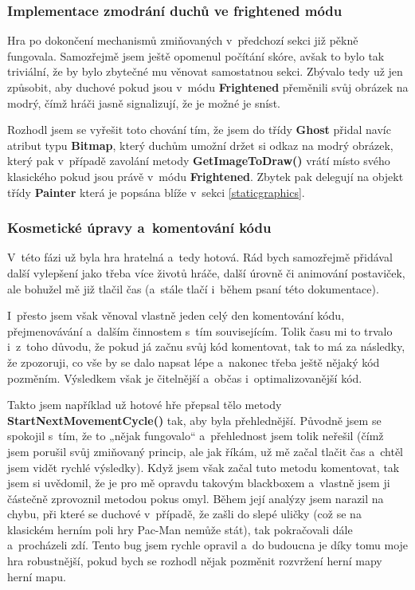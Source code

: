 \documentclass[a4]{article}
\begin{document}
\subsubsection{Implementace zmodrání duchů ve frightened módu} \label{frightenedmode}
Hra po dokončení mechanismů zmiňovaných v~předchozí sekci již pěkně fungovala. Samozřejmě jsem ještě opomenul počítání skóre, avšak to bylo tak triviální, že by bylo zbytečné mu věnovat samostatnou sekci. Zbývalo tedy už jen způsobit, aby duchové pokud jsou v~módu \textbf{Frightened} přeměnili svůj obrázek na modrý, čímž hráči jasně signalizují, že je možné je sníst. 

Rozhodl jsem se vyřešit toto chování tím, že jsem do třídy \textbf{Ghost} přidal navíc atribut typu \textbf{Bitmap}, který duchům umožní držet si odkaz na modrý obrázek, který pak v~případě zavolání metody \textbf{GetImageToDraw()} vrátí místo svého klasického pokud jsou právě v~módu \textbf{Frightened}. Zbytek pak delegují na objekt třídy \textbf{Painter} která je popsána blíže v~sekci \ref{staticgraphics}.

\subsubsection{Kosmetické úpravy a~komentování kódu}
V~této fázi už byla hra hratelná a~tedy hotová. Rád bych samozřejmě přidával další vylepšení jako třeba více životů hráče, další úrovně či animování postaviček, ale bohužel mě již tlačil čas (a~stále tlačí i~během psaní této dokumentace). 

I~přesto jsem však věnoval vlastně jeden celý den komentování kódu, přejmenovávání a~dalším činnostem s~tím souvisejícím. Tolik času mi to trvalo i~z~toho důvodu, že pokud já začnu svůj kód komentovat, tak to má za následky, že zpozoruji, co vše by se dalo napsat lépe a~nakonec třeba ještě nějaký kód pozměním. Výsledkem však je čitelnější a~občas i~optimalizovanější kód. 

Takto jsem například už hotové hře přepsal tělo metody \textbf{StartNextMovementCycle()} tak, aby byla přehlednější. Původně jsem se spokojil s~tím, že to „nějak fungovalo“ a~přehlednost jsem tolik neřešil (čímž jsem porušil svůj zmiňovaný princip, ale jak říkám, už mě začal tlačit čas a~chtěl jsem vidět rychlé výsledky). Když jsem však začal tuto metodu komentovat, tak jsem si uvědomil, že je pro mě opravdu takovým blackboxem a~vlastně jsem ji částečně zprovoznil metodou pokus omyl. Během její analýzy jsem narazil na chybu, při které se duchové v~případě, že zašli do slepé uličky (což se na klasickém herním poli hry Pac-Man nemůže stát), tak pokračovali dále a~procházeli zdí. Tento bug jsem rychle opravil a~do budoucna je díky tomu moje hra robustnější, pokud bych se rozhodl nějak pozměnit rozvržení herní mapy herní mapu.
\end{document}
